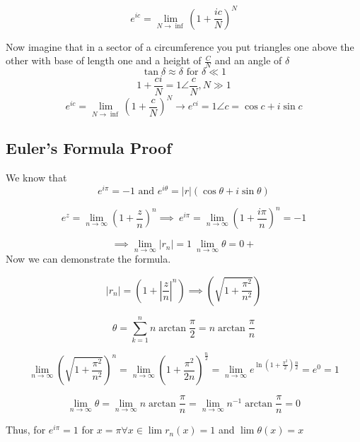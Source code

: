 \[
	e^{ic} = \lim_{N \to \inf} {\left( 1 + \frac{ic}{N}\right)}^N
\]

 Now imagine that in a sector of a circumference you put triangles one above the other with base of length one and a height of \(\frac{C}{N}\) and 
 an angle of \(\delta\)
\[
	\tan{\delta} \approx \delta \text{ for } \delta \ll 1
\]
\[
	1 + \frac{ci}{N} = 1 \angle \frac{c}{N}, N \gg 1
\]
\[
	e^{ic} = \lim_{N \to \inf} {\left( 1 + \frac{c}{N}\right)}^N \to e^{ci} = 1 \angle c = \cos{c} + i\sin{c}
\]

\subsection{Euler's Formula Proof}
We know that
\[
	e^{i\pi} = -1 \text{ and } e^{i\theta} = |r|(\cos{\theta} + i\sin{\theta})
\]

\[
	e^{z} = \lim_{n \to \infty} {\left( 1 + \frac{z}{n}\right)}^n \implies\ e^{i\pi} = \lim_{n \to \infty} {\left( 1 + \frac{i\pi}{n}\right)}^n = -1
\]

\[
	\implies \lim_{n \to \infty} |r_n| = 1\ \lim_{n \to \infty} \theta = 0+
\]
 Now we can demonstrate the formula.

\[
	|r_n| = \left( 1 + \left|\frac{z}{n}\right|^n \right) \implies \left( \sqrt{1 + \frac{\pi^2}{n^2}}\right)
\]

\[
	\theta = \sum_{k = 1}^{n} n \arctan \frac{\pi}{2} = n \arctan \frac{\pi}{n}
\]

\[
	\lim_{n \to \infty} {\left( \sqrt{1 + \frac{\pi^2}{n^2}}\right)}^n = \lim_{n \to \infty} {\left( 1 + \frac{\pi^2}{2n} \right) }^{\frac{n}{2}}
	= \lim_{n \to \infty} e^{\ln\left(1 +\frac{\pi^2}{2}\right) \frac{n}{2}} = e^0 = 1
\]

\[
	\lim_{n \to \infty} \theta = \lim_{n \to \infty} n \arctan \frac{\pi}{n} = \lim_{n \to \infty} n^{-1} \arctan\frac{\pi}{n} = 0
\]

Thus, for \(e^{i\pi} = 1\) for \(x = \pi \forall x \in \lim r_n (x) = 1\) and \( \lim \theta (x) = x\)

\QED
